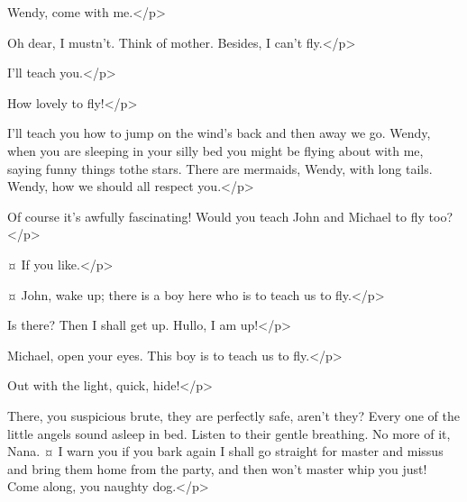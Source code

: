 \begin{drama}
\peterspeaks
Wendy, come with me.</p>

\wendyspeaks
Oh dear, I mustn't.
Think of mother.
Besides, I can't fly.</p>

\peterspeaks
I'll teach you.</p>

\wendyspeaks
How lovely to fly!</p>

\peterspeaks
I'll teach you how to jump on the wind's back and then away we go.
Wendy, when you are sleeping in your silly bed you might be flying about with me, saying funny things tothe stars.
There are mermaids, Wendy, with long tails.
Wendy, how we should all respect you.</p>


\wendyspeaks
Of course it's awfully fascinating!
Would you teach John and Michael to fly too?</p>

\peterspeaks {}¤
If you like.</p>

\wendyspeaks {}¤
John, wake up; there is a boy here who is to teach us to fly.</p>

\johnspeaks
Is there?
Then I shall get up.
Hullo, I am up!</p>

\wendyspeaks
Michael, open your eyes.
This boy is to teach us to fly.</p>


\johnspeaks
Out with the light, quick, hide!</p>


\lizaspeaks
There, you suspicious brute, they are perfectly safe, aren't they?
Every one of the little angels sound asleep in bed.
Listen to their gentle breathing.
No more of it, Nana.
¤
I warn you if you bark again I shall go straight for master and missus and bring them home from the party, and then won't master whip you just!
Come along, you naughty dog.</p>


\end{drama}

